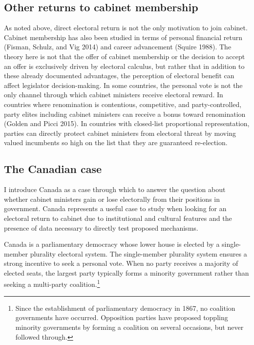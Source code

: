 \documentclass[letter,12pt]{article}
\begin{document}
\subsection*{Other returns to cabinet membership}
As noted above, direct electoral return is not the only motivation to join cabinet. Cabinet membership has also been studied in terms of personal financial return (Fisman, Schulz, and Vig 2014) and career advancement (Squire 1988). The theory here is not that the offer of cabinet membership or the decision to accept an offer is exclusively driven by electoral calculus, but rather that in addition to these already documented advantages, the perception of electoral benefit can affect legislator decision-making. In some countries, the personal vote is not the only channel through which cabinet ministers receive electoral reward. In countries where renomination is contentious, competitive, and party-controlled, party elites including cabinet ministers can receive a bonus toward renomination (Golden and Picci 2015). In countries with closed-list proportional representation, parties can directly protect cabinet ministers from electoral threat by moving valued incumbents so high on the list that they are guaranteed re-election.

\subsection*{The Canadian case}
I introduce Canada as a case through which to answer the question about whether cabinet ministers gain or lose electorally from their positions in government. Canada represents a useful case to study when looking for an electoral return to cabinet due to institutional and cultural features and the presence of data necessary to directly test proposed mechanisms. 

Canada is a parliamentary democracy whose lower house is elected by a single-member plurality electoral system. The single-member plurality system ensures a strong incentive to seek a personal vote. When no party receives a majority of elected seats, the largest party typically forms a minority government rather than seeking a multi-party coalition.\footnote{Since the establishment of parliamentary democracy in 1867, no coalition governments have occurred. Opposition parties have proposed toppling minority governments by forming a coalition on several occasions, but never followed through.} 
\end{document}

